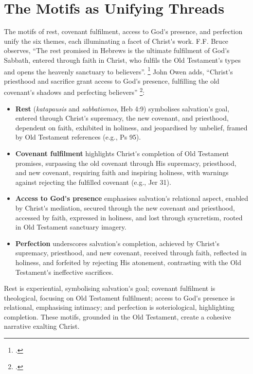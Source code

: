 \documentclass[12pt]{article}
\def\apos{^^27}         %
\def\christ{the Messiah}
\def\christ{Christ}
\begin{document}
\section{The Motifs as Unifying Threads}
The motifs of rest, covenant fulfilment, access to God\apos{}s presence, and
perfection unify the six themes, each illuminating a facet of \christ{}\apos{}s
work.  F.F. Bruce observes, ``The rest promised in Hebrews is the ultimate
fulfilment of God\apos{}s Sabbath, entered through faith in Christ, who fulfils
the Old Testament\apos{}s types and opens the heavenly sanctuary to believers''.
\footcite[96]{Bruce1964}
%
John Owen adds, ``Christ\apos{}s priesthood and sacrifice grant access to
God\apos{}s presence, fulfilling the old covenant\apos{}s shadows and perfecting
believers'' \footcite[3:89]{Owen1854}:
%
\begin{itemize}
    \item \textbf{Rest} (\emph{katapausis} and \emph{sabbatismos}, Heb 4:9)
    symbolises salvation\apos{}s goal, entered through \christ{}\apos{}s
    supremacy, the new covenant, and priesthood, dependent on faith, exhibited
    in holiness, and jeopardised by unbelief, framed by Old Testament references
    (e.g., Ps 95).
    \item \textbf{Covenant fulfilment} highlights \christ{}\apos{}s completion
    of Old Testament promises, surpassing the old covenant through His
    supremacy, priesthood, and new covenant, requiring faith and inspiring
    holiness, with warnings against rejecting the fulfilled covenant (e.g., Jer
    31).
    \item \textbf{Access to God\apos{}s presence} emphasises salvation\apos{}s
    relational aspect, enabled by \christ{}\apos{}s mediation, secured through
    the new covenant and priesthood, accessed by faith, expressed in holiness,
    and lost through syncretism, rooted in Old Testament sanctuary imagery.
    \item \textbf{Perfection} underscores salvation\apos{}s completion, achieved
    by \christ{}\apos{}s supremacy, priesthood, and new covenant, received
    through faith, reflected in holiness, and forfeited by rejecting His
    atonement, contrasting with the Old Testament\apos{}s ineffective
    sacrifices.
\end{itemize}
%
Rest is experiential, symbolising salvation\apos{}s goal; covenant fulfilment is
theological, focusing on Old Testament fulfilment; access to God\apos{}s
presence is relational, emphasising intimacy; and perfection is soteriological,
highlighting completion. These motifs, grounded in the Old Testament, create a
cohesive narrative exalting \christ{}.
\end{document}
